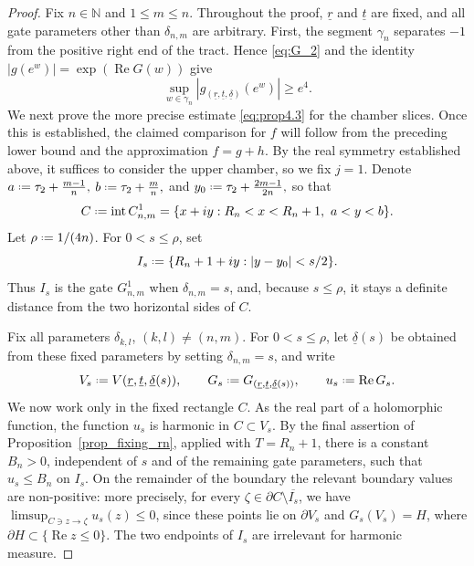 \documentclass[a4paper, 11pt, reqno]{amsart}
\numberwithin{equation}{section}
\theoremstyle{plain}
\newcommand*{\defeq}{\mathrel{\vcenter{\baselineskip0.5ex \lineskiplimit0pt
 \hbox{\scriptsize.}\hbox{\scriptsize.}}}=}
\theoremstyle{remark}
\newcommand{\N}{{\mathbb{N}}}
\newcommand{\uldelta}{\underline{\delta}}
\newcommand{\ulr}{\underline{r}}
\newcommand{\ult}{\underline{t}}
\newcommand{\Rea}{\operatorname{Re }}
\begin{document}
\begin{proof}
		Fix \(n\in\N\) and \(1\leq m\leq n\). Throughout the proof, \(\ulr\) and \(\ult\) are fixed, and all gate parameters other than \(\delta_{n,m}\) are arbitrary. First, the segment \(\gamma_n\) separates \(-1\) from the positive right end of the tract. Hence \eqref{eq:G_2} and the identity \(|g(e^w)|=\exp(\Rea G(w))\) give
		\[
		\sup_{w\in\gamma_n}|g_{(\ulr,\ult,\uldelta)}(e^w)|\geq e^4.
		\]
		We next prove the more precise estimate \eqref{eq:prop4.3} for the chamber slices. Once this is established, the claimed comparison for \(f\) will follow from the preceding lower bound and the approximation \(f=g+h\). By the real symmetry established above, it suffices to consider the upper chamber, so we fix \(j=1\). Denote
	$a\defeq \tau_2+\frac{m-1}{n},$
	$b\defeq \tau_2+\frac{m}{n},$ and
	$y_0\defeq \tau_2+\frac{2m-1}{2n},$
	so that
	\[
	C\defeq \operatorname{int} C^1_{n,m}
	=\{x+iy:R_n<x<R_n+1,\ a<y<b\}.
	\]
	Let \(\rho\defeq1/(4n)\). For \(0<s\le\rho\), set
	\[
	I_s\defeq\{R_n+1+iy: |y-y_0|<s/2\}.
	\]
	Thus \(I_s\) is the gate \(G^1_{n,m}\) when \(\delta_{n,m}=s\), and, because
	\(s\le\rho\), it stays a definite distance from the two horizontal sides of
	\(C\).
	
	Fix all parameters \(\delta_{k,l}\), \((k,l)\ne(n,m)\). For \(0<s\le\rho\), let
	\(\uldelta(s)\) be obtained from these fixed parameters by setting
	\(\delta_{n,m}=s\), and write
	\[
	V_s\defeq V(\ulr,\ult,\uldelta(s)),\qquad
	G_s\defeq G_{(\ulr,\ult,\uldelta(s))},\qquad
	u_s\defeq \Rea G_s.
	\]
	We now work only in the fixed rectangle \(C\). As the real part of a holomorphic function, the function \(u_s\) is harmonic in \(C\subset V_s\). By the final assertion of Proposition~\ref{prop_fixing_rn}, applied with \(T=R_n+1\), there is a constant \(B_n>0\), independent of \(s\) and of the remaining gate parameters, such that \(u_s\leq B_n\) on \(I_s\). On the remainder of the boundary the relevant boundary values are non-positive: more precisely, for every \(\zeta\in\partial C\setminus\overline{I_s}\), we have \(\limsup_{C\ni z\to\zeta}u_s(z)\leq0\), since these points lie on \(\partial V_s\) and \(G_s(V_s)=H\), where \(\partial H\subset\{\Rea z\leq0\}\). The two endpoints of \(I_s\) are irrelevant for harmonic measure.
	

\end{proof}
\end{document}
